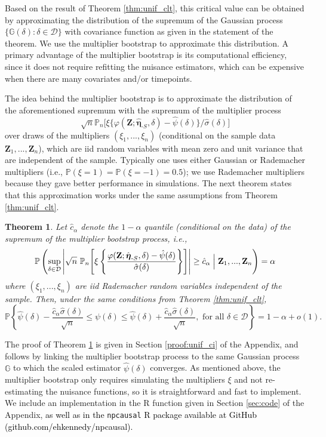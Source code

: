 \documentclass[12pt]{article}
\newcommand{\Pb}{\mathbb{P}}
\newcommand{\Pn}{\mathbb{P}_n}
\newcommand{\Gb}{\mathbb{G}}
\newcommand{\bZ}{\mathbf{Z}}
\newtheorem{theorem}{Theorem}
\theoremstyle{remark}
\begin{document}
Based on the result of Theorem \ref{thm:unif_clt}, this critical value can be obtained by approximating the distribution of the supremum of the Gaussian process $\{\Gb(\delta) : \delta \in \mathcal{D}\}$ with covariance function as given in the statement of the theorem. We use the multiplier bootstrap \autocite{gine1984some, van1996weak, belloni2015uniformly} to approximate this distribution. A primary advantage of the multiplier bootstrap is its computational efficiency, since it does not require refitting the nuisance estimators, which can be expensive when there are many covariates and/or timepoints.

The idea behind the multiplier bootstrap is to approximate the distribution of the aforementioned supremum with the supremum of the  multiplier process
$$ \sqrt{n} \Pn \Big[ \xi \{ \varphi(\bZ;\hat{\boldsymbol\eta}_{\text{-}S},\delta)- \hat\psi(\delta) \} / \hat\sigma(\delta) \Big] $$
over draws of the multipliers $(\xi_1,...,\xi_n)$ (conditional on the sample data $\bZ_1,...,\bZ_n$), which are iid random variables with mean zero and unit variance that are independent of the sample. Typically one uses either Gaussian or Rademacher multipliers (i.e., $\Pb(\xi=1)=\Pb(\xi=-1)=0.5$); we use Rademacher multipliers because they gave better performance in simulations. The next theorem states that this approximation works under the same assumptions from Theorem \ref{thm:unif_clt}.

\begin{theorem}
\label{thm:unif_ci}
Let $\hat{c}_\alpha$ denote the $1-\alpha$ quantile (conditional on the data) of the supremum of the multiplier bootstrap process, i.e.,
$$ \Pb\left( \sup_{\delta \in \mathcal{D}} \left| \sqrt{n} \ \Pn\!\left[ \xi \left\{ \frac{\varphi(\bZ;\hat{\boldsymbol\eta}_{\text{-}S},\delta)- \hat\psi(\delta)}{\hat\sigma(\delta)}  \right\} \right] \right| \geq \hat{c}_\alpha \Bigm| \bZ_1,...,\bZ_n \right) = \alpha $$
where $(\xi_1,...,\xi_n)$ are iid Rademacher random variables independent of the sample. Then, under the same conditions from Theorem \ref{thm:unif_clt},
$$ \Pb \left\{ \hat\psi(\delta) - \frac{ \hat{c}_\alpha \hat\sigma(\delta)}{\sqrt{n} } \leq \psi(\delta) \leq \hat\psi(\delta) +  \frac{ \hat{c}_\alpha \hat\sigma(\delta)}{\sqrt{n} }, \text{ for all } \delta \in \mathcal{D} \right\} = 1 - \alpha + o(1) . $$
\end{theorem}

The proof of Theorem \ref{thm:unif_ci} is given in Section \ref{proof:unif_ci} of the Appendix, and follows by linking the multiplier bootstrap process to the same Gaussian process $\Gb$ to which the scaled estimator $\hat\psi(\delta)$ converges. As mentioned above, the multiplier bootstrap only requires simulating the multipliers $\xi$ and not re-estimating the nuisance functions, so it is straightforward and fast to implement. We include an implementation in the R function given in Section \ref{sec:code} of the Appendix, \textcolor{black}{as well as in the} \verb|npcausal| \textcolor{black}{R package available at GitHub (github.com/ehkennedy/npcausal).}
\end{document}
